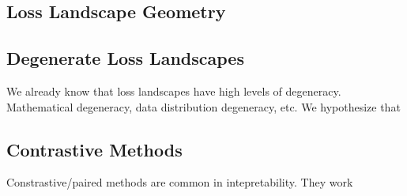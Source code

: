 \documentclass{article}
\theoremstyle{plain}
\theoremstyle{definition}
\theoremstyle{remark}
\begin{document}
\subsection{Loss Landscape Geometry}



\subsection{Degenerate Loss Landscapes}

We already know that loss landscapes have high levels of degeneracy. Mathematical degeneracy, data distribution degeneracy, etc. We hypothesize that 

\subsection{Contrastive Methods}
Constrastive/paired methods are common in intepretability. They work
\end{document}
